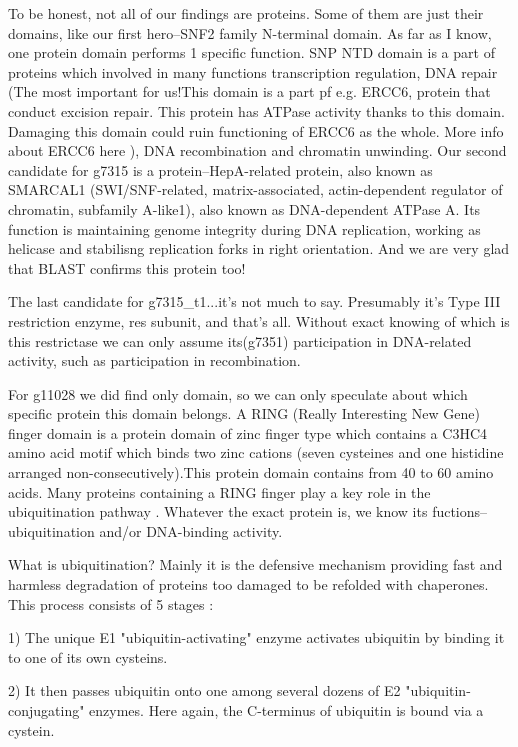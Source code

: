 \documentclass{article}
\begin{document}
 To be honest, not all of our findings are proteins. Some of them are just their domains, like our first hero--SNF2 family N-terminal domain. As far as I know, one protein domain performs 1 specific function. SNP NTD domain is a part of proteins which involved in many functions transcription regulation, DNA repair (The most important for us!This domain is a part pf e.g. ERCC6, protein that conduct excision repair. This protein has ATPase activity thanks to this domain. Damaging this domain could ruin functioning of ERCC6 as the whole. More info about ERCC6 here \cite{5}), DNA recombination and chromatin unwinding.
 Our second candidate for g7315 is a protein--HepA-related protein, also known as SMARCAL1 (SWI/SNF-related, matrix-associated, actin-dependent regulator of chromatin, subfamily A-like1), also known as DNA-dependent ATPase A. Its function is maintaining genome integrity during DNA replication, working as helicase and stabilisng replication forks in right orientation.  And we are very glad that BLAST confirms this protein too!
 
 The last candidate for g7315_t1...it's not much to say. Presumably it's Type III restriction enzyme, res subunit, and that's all. Without exact knowing of which is this restrictase we can only assume its(g7351) participation in DNA-related activity, such as participation in recombination. 
 
 For g11028 we did find only domain, so we can only speculate about which specific protein this domain belongs. A RING (Really Interesting New Gene) finger domain is a protein domain of zinc finger type which contains a C3HC4 amino acid motif which binds two zinc cations (seven cysteines and one histidine arranged non-consecutively).This protein domain contains from 40 to 60 amino acids. Many proteins containing a RING finger play a key role in the ubiquitination pathway \cite{6}. Whatever the exact protein is, we know its fuctions--ubiquitination and/or DNA-binding activity.
 
 What is ubiquitination? Mainly it is the defensive mechanism providing fast and harmless degradation of proteins too damaged to be refolded with chaperones. This process consists of 5 stages \cite{7}:
 
 1) The unique E1 "ubiquitin-activating" enzyme activates ubiquitin by binding it to one of its own cysteins.
 
 2) It then passes ubiquitin onto one among several dozens of E2 "ubiquitin-conjugating" enzymes. Here again, the C-terminus of ubiquitin is bound via a cystein.
 
\end{document}
